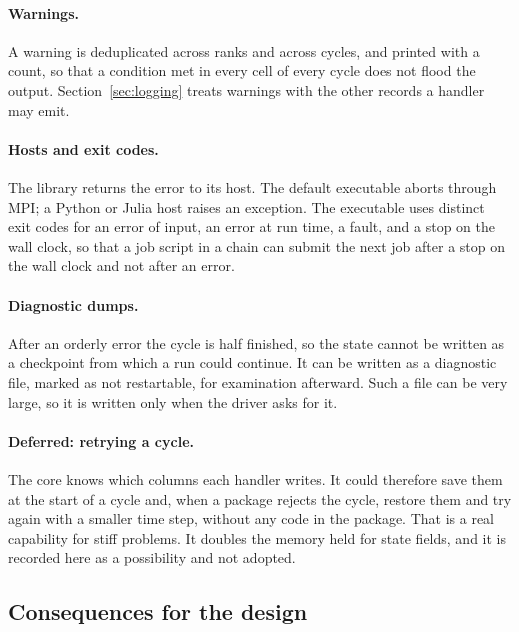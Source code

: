 \documentclass[11pt,a4paper]{article}
\begin{document}
\paragraph{Warnings.}  A warning is deduplicated across ranks and across
cycles, and printed with a count, so that a condition met in every cell of
every cycle does not flood the output.  Section~\ref{sec:logging} treats
warnings with the other records a handler may emit.

\paragraph{Hosts and exit codes.}  The library returns the error to its
host.  The default executable aborts through MPI; a Python or Julia host
raises an exception.  The executable uses distinct exit codes for an error
of input, an error at run time, a fault, and a stop on the wall clock, so
that a job script in a chain can submit the next job after a stop on the
wall clock and not after an error.

\paragraph{Diagnostic dumps.}  After an orderly error the cycle is half
finished, so the state cannot be written as a checkpoint from which a run
could continue.  It can be written as a diagnostic file, marked as not
restartable, for examination afterward.  Such a file can be very large,
so it is written only when the driver asks for it.

\paragraph{Deferred: retrying a cycle.}  The core knows which columns each
handler writes.  It could therefore save them at the start of a cycle and,
when a package rejects the cycle, restore them and try again with a smaller
time step, without any code in the package.  That is a real capability for
stiff problems.  It doubles the memory held for state fields, and it is
recorded here as a possibility and not adopted.

\subsection{Consequences for the design}
\end{document}
